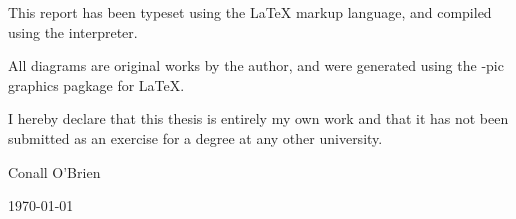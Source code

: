 
This report has been typeset using the \LaTeX{} markup language, 
and compiled using the \LaTeXe{} interpreter. 


All diagrams are original works by the author, and were generated 
using the \Xy-pic{} graphics pagkage for \LaTeX{}.


\vfill


I hereby declare that this thesis is entirely my own work and that it
has not been submitted as an exercise for a degree at any other
university.

\vspace{35mm}

\begin{flushright}

\underline{\hspace*{75mm}}

Conall O'Brien

\today

\end{flushright}
